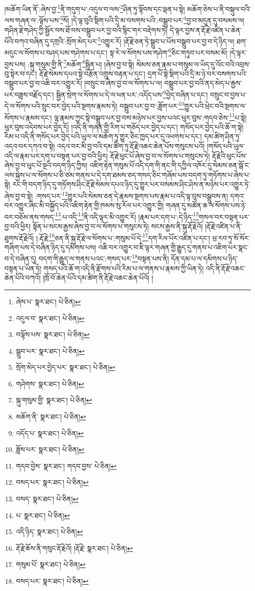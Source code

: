 །མཆོག་ཡིན་ནོ་:ཞེས་བྱ་\footnote{ཞེས་པ་  སྣར་ཐང་།  པེ་ཅིན། }ནི་གདུག་པ་:འདུལ་བ་ལས་\footnote{འདུལ་བ་  སྣར་ཐང་།  པེ་ཅིན། }ཤིན་ཏུ་སྟོབས་དང་ལྡན་པ་སྟེ། མཆོག་ཅེས་པ་ནི་བསྐུལ་བའི་ལས་གཞན་ལ་:ལྟོས་པས་\footnote{བལྟོས་པས་  སྣར་ཐང་།  པེ་ཅིན། }སོ། །དེ་ལྟ་བུའི་སྡིག་པའི་དྲི་མ་བསགས་པའི་:བསྒྲུབ་པར་\footnote{སྒྲུབ་པར་  སྣར་ཐང་།  པེ་ཅིན། }བྱ་བ་མདུན་དུ་བསམས་ལ། གཤིན་རྗེ་གཤེད་ཀྱི་སྦྱོར་བས་ཐོ་བས་བསྒྲུབ་པར་བྱ་བའི་སྙིང་གར་བརྡེགས་ཏེ། དེ་ལྟར་བྱས་ན་རྡོ་རྗེ་འཛིན་པ་ཆེན་པོའི་བཀའ་བཞིན་དུ་དགྲའི་:སྲོག་མེད་པར་\footnote{སྲོག་མེད་པར་བྱེད་པར་  སྣར་ཐང་།  པེ་ཅིན། }འགྱུར་རོ། །རྡོ་རྗེ་ཅན་ཏེ་སྒྲུབ་པ་པོས་བསྒྲུབ་པར་བྱ་བ་དེ་ཉིད་ལ། ཐག་མདུང་ལ་སོགས་པ་བཤད་པས་གཤེགས་པ་དང་། སྟ་རེ་ལ་སོགས་པས་གཤེག་\footnote{གཤེགས་  སྣར་ཐང་།  པེ་ཅིན། }ཅིང་གཏུབ་པར་བསམ་མོ། །དེ་ལྟར་བྱས་པས། :སྐུ་གསུམ་གྱི་ནི་\footnote{སྐུ་གསུམ་གྱི་  སྣར་ཐང་།  པེ་ཅིན། }མཆོག་\footnote{མཆོག་ནི་  སྣར་ཐང་།  པེ་ཅིན། }སྦྱིན་པ། །ཞེས་བྱ་བ་སྟེ། སེམས་ཅན་རྣམ་པ་གསུམ་ལ་ཡིད་དུ་འོང་བའི་འབྲས་བུ་སྟེར་བ་དང་། རྡོ་རྗེ་སེམས་དཔའ་སྟེ་བརྩོན་འགྲུས་བརྟན་པ་དང་། དྲག་པོ་སྟེ་སྡིག་པའི་དྲི་མ་ཉེ་བར་བསགས་པའི་བསྒྲུབ་པར་བྱ་བ་འཆི་བར་འགྱུར་རོ། །བསྲུང་བ་ཞེས་བྱ་བ་ལ་སོགས་པ་ལ། བསྒྲུབ་པར་བྱ་བའི་ནད་མེད་པ་རྒྱས་པར་བཟླས་བརྗོད་དང་། སྦྱིན་སྲེག་ལ་སོགས་པ་དེ་ལ་ཕན་པར་:འདོད་པས་\footnote{འདོད་པ་  སྣར་ཐང་།  པེ་ཅིན། }བྱེད་བཞིན་པ་དང་། བསྲུང་བ་བྱས་པ་དེ་ལ་སོགས་པའི་སྲུང་བར་བྱེད་པའི་སྔགས་རྣམས་ཏེ། བསྒྲུབ་པར་བྱ་བ་:ཟློག་པར་\footnote{ཟློས་པར་  སྣར་ཐང་།  པེ་ཅིན། }གྱུར་པའི་ཕྲེང་བའི་སྔགས་ལ་སོགས་པ་རྣམས་དང་། ལྷ་རྣམས་ཀྱང་སྟེ་བསྒྲུབ་པར་བྱ་བས་མཉེས་པར་བྱས་པའང་ཕུར་བུས་:གདབ་ཅེས་\footnote{གདབ་བྱེས་  སྣར་ཐང་། གདབ་བྱས་  པེ་ཅིན། }པ་སྟེ། ཕུར་བུས་འདེབས་པར་བྱེད་དོ། །འདི་ནི་གཞན་གྱི་རིག་པ་གཅོད་པར་བྱེད་པ་དང་། གསོད་པར་བྱེད་པའི་ཆོ་ག་སྟེ། རིམ་པ་འདི་ནི་གསོད་པར་བྱེད་པའི་ཡུལ་ལ་མཆོག་ཏུ་གྱུར་ཅིང་ཁྱད་པར་དུ་འཕགས་པ་དང་། དམ་ཚིག་ཤིན་ཏུ་འདའ་བར་དཀའ་བ་སྟེ། འདའ་བར་མི་བྱ་བའི་དམ་ཚིག་ཏུ་རྡོ་རྗེ་འཆང་ཆེན་པོས་གསུངས་པའོ། །གསོད་པའི་ཡུལ་འདི་ལ་རྣམ་པར་དག་པ་བསྟན་པར་བྱ་བའི་ཕྱིར། རྡོ་རྗེ་ཕུང་པོ་ཞེས་བྱ་བ་ལ་སོགས་པ་གསུངས་ཏེ། རྡོ་རྗེའི་ཕུང་པོས་ཞེས་བྱ་བ་ཕུང་པོ་ལྔའི་བདག་ཉིད་ཀྱིས། འཇིག་རྟེན་གསུམ་པོ་འདི་དག་གི་ནང་གི་དཀྱིལ་འཁོར་དུ་སེམས་ཅན་སྒོ་ང་ལས་སྐྱེས་པ་ལ་སོགས་པ་ཅི་ཙམ་གནས་པ་དེ་དག་ཐམས་ཅད་གསད་ཅིང་གཞོམ་པས་བདག་ཏུ་གཏོགས་པ་ཞེས་པ་སྟེ། རང་གི་བདག་ཉིད་དུ་གཏོགས་ཤིང་རྡོ་རྗེ་སེམས་དཔའ་ཉིད་དུ་གྱུར་པར་བསམས་ཤིང་ཤེས་ན་མཉེས་པར་འགྱུར་ཏེ་ཞེས་བྱ་བ་སྟེ། :གསད་པར་\footnote{བསད་པར་  སྣར་ཐང་།  པེ་ཅིན། }གྱུར་པའི་སེམས་ཅན་དེ་རྣམས་སྔགས་པས་རྣམ་པ་འདི་ལྟ་བུས་བསྒྲུབས་ན། དགའ་བར་འགྱུར་ཞིང་མི་བསྐྱོད་པའི་འཇིག་རྟེན་གྱི་ཁམས་སུ་རོལ་པར་འགྱུར་གྱི། གཞན་དུ་མཚོན་ཆ་ལ་སོགས་པས་ཉེ་བར་བཅོམ་ནས་གསད་\footnote{བསད་  སྣར་ཐང་།  པེ་ཅིན། }:པ་འདི་\footnote{པ་  སྣར་ཐང་།  པེ་ཅིན། }ནི་འདི་ལྟར་མི་འགྱུར་རོ། །རྣམ་པར་དག་པ་:དེ་ཉིད་\footnote{འདི་ཉིད་  སྣར་ཐང་།  པེ་ཅིན། }གསལ་བར་བསྟན་པར་བྱ་བའི་ཕྱིར། སྟོན་པ་སངས་རྒྱས་ཞེས་བྱ་བ་ལ་སོགས་པ་གསུངས་ཏེ། སངས་རྒྱས་ནི་སྐུ་རྡོ་རྗེའོ། །རྡོ་རྗེ་འཛིན་པ་ནི་ཐུགས་རྡོ་རྗེའོ། །:རྡོ་རྗེ་\footnote{རྡོ་རྗེ་ཆོས་ནི་གསུང་རྡོ་རྗེའོ། །རྡོ་རྗེ་  སྣར་ཐང་།  པེ་ཅིན། }ཅན་ནི་སྐུ་རྡོ་རྗེ་ལ་སོགས་པ་:གསུམ་པོ་དེ་\footnote{གསུམ་པོ་  སྣར་ཐང་།  པེ་ཅིན། }དག་རིལ་པོར་འཛིན་པ་དང་། ཕྲ་རབ་ཏུ་སོ་སོར་གཞིག་པས་དེ་བཞིན་ཉིད་དུ་དམིགས་པས། འཆི་བར་འགྱུར་བ་ཇི་ལྟར་གཞན་གྱི་རྒྱུད་དུ་གནས་པ་འཇིག་པར་སྣང་བ་དེ་བཞིན་དུ། བདག་གི་རྒྱུད་ལ་གནས་པའང་:གསད་པར་\footnote{བསད་པར་  སྣར་ཐང་།  པེ་ཅིན། }བསྟན་པས་ནི། དོན་དམ་པ་ལ་དམིགས་པ་ཉིད་བསྟན་པ་ཡིན་ཏེ། གསད་པའི་ཆོ་ག་འདི་ནི་རྫོགས་པའི་རིམ་པ་ལ་གནས་པ་རྣམས་ཀྱི་ཡིན་ཏེ། འདི་ནི་རྡོ་རྗེ་འཆང་ཆེན་པོའི་བཀའོ། །ཁྲོ་བོ་ཆེན་པོའི་དམ་ཚིག་ནི་རྡོ་རྗེ་འཆང་ཆེན་པོའོ། །
